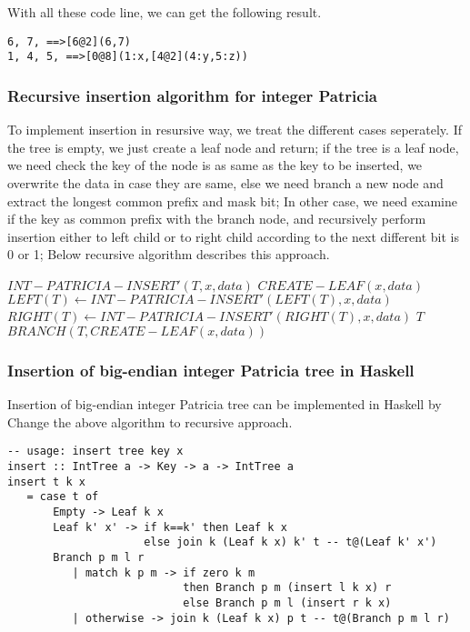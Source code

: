\documentclass{article}
\begin{document}
With all these code line, we can get the following result.
\begin{verbatim}
6, 7, ==>[6@2](6,7)
1, 4, 5, ==>[0@8](1:x,[4@2](4:y,5:z))
\end{verbatim}

\subsubsection{Recursive insertion algorithm for integer Patricia}

To implement insertion in resursive way, we treat the different cases
seperately. If the tree is empty, we just create a leaf node and
return; if the tree is a leaf node, we need check the key of the
node is as same as the key to be inserted, we overwrite the data in
case they are same, else we need branch a new node and extract the
longest common prefix and mask bit; In other case, we need examine if
the key as common prefix with the branch node, and recursively perform
insertion either to left child or to right child according to the next
different bit is 0 or 1; Below recursive algorithm describes this approach.

\begin{algorithmic}
\STATE $INT-PATRICIA-INSERT'(T, x, data)$
   \RETURN $CREATE-LEAF(x, data)$
     \STATE $LEFT(T) \leftarrow INT-PATRICIA-INSERT'(LEFT(T), x, data)$
   \ELSE
     \STATE $RIGHT(T) \leftarrow INT-PATRICIA-INSERT'(RIGHT(T), x, data)$
   \ENDIF
   \RETURN $T$
\ELSE
   \RETURN $BRANCH(T, CREATE-LEAF(x, data))$
\ENDIF
\end{algorithmic}

\subsubsection*{Insertion of big-endian integer Patricia tree in Haskell}
Insertion of big-endian integer Patricia tree can be implemented in Haskell
by Change the above algorithm to recursive approach.

\lstset{language=Haskell}
\begin{lstlisting}
-- usage: insert tree key x
insert :: IntTree a -> Key -> a -> IntTree a
insert t k x 
   = case t of
       Empty -> Leaf k x
       Leaf k' x' -> if k==k' then Leaf k x
                     else join k (Leaf k x) k' t -- t@(Leaf k' x')
       Branch p m l r
          | match k p m -> if zero k m
                           then Branch p m (insert l k x) r
                           else Branch p m l (insert r k x)
          | otherwise -> join k (Leaf k x) p t -- t@(Branch p m l r)
\end{lstlisting}
\end{document}

